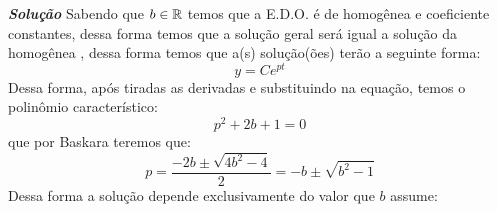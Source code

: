 \linespread{1.5}

\textbf{\textit{Solução}}
Sabendo que $b\in \mathbb{R}$ temos que a E.D.O. é de homogênea  e coeficiente constantes, dessa forma temos que a solução geral será igual a solução da homogênea , dessa forma temos que a(s) solução(ões) terão a seguinte forma:
\begin{equation*}
    y = Ce^{pt}
\end{equation*}
Dessa forma, após tiradas as derivadas e substituindo na equação, temos o polinômio característico:
\begin{equation*}
    p^2 + 2b + 1 = 0 
\end{equation*}
que por Baskara teremos que:
\begin{equation*}
    p = \frac{-2b\pm \sqrt{4b^2-4}}{2} = -b\pm \sqrt{b^2-1}
\end{equation*}
Dessa forma a solução depende exclusivamente do valor que $b$ assume:
